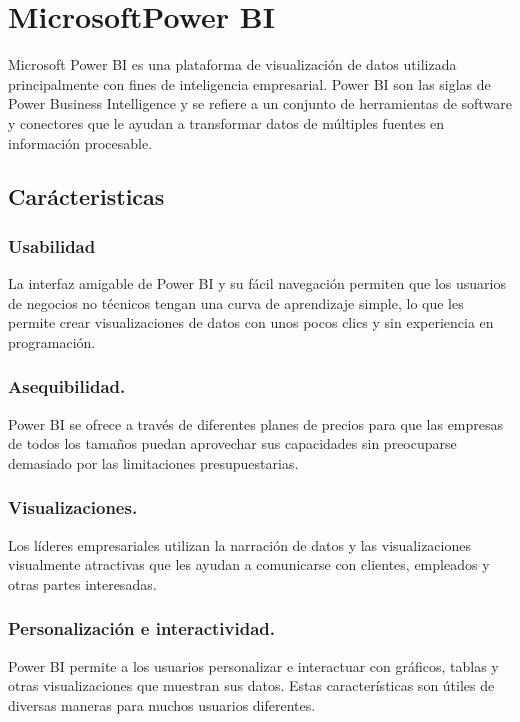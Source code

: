 \section{MicrosoftPower BI}
Microsoft Power BI es una plataforma de visualización de datos utilizada principalmente con fines 
de inteligencia empresarial. Power BI son las siglas de Power Business Intelligence y se refiere a 
un conjunto de herramientas de software y conectores que le ayudan a transformar datos de múltiples 
fuentes en información procesable. \cite{power-bi-visualization}


\subsection{Carácteristicas}

\subsubsection{Usabilidad}
La interfaz amigable de Power BI y su fácil navegación permiten que los usuarios de negocios no técnicos 
tengan una curva de aprendizaje simple, lo que les permite crear visualizaciones de datos con unos pocos clics y sin experiencia en programación.

\subsubsection{Asequibilidad.} 
Power BI se ofrece a través de diferentes planes de precios para que las empresas de todos los tamaños 
puedan aprovechar sus capacidades sin preocuparse demasiado por las limitaciones presupuestarias.

\subsubsection{Visualizaciones.} 
Los líderes empresariales utilizan la narración de datos y las visualizaciones visualmente atractivas 
que les ayudan a comunicarse con clientes, empleados y otras partes interesadas.

\subsubsection{Personalización e interactividad.}
Power BI permite a los usuarios personalizar e interactuar con gráficos, tablas y otras 
visualizaciones que muestran sus datos. Estas características son útiles de diversas maneras para muchos usuarios diferentes. \cite{microsoft-power-bi}


